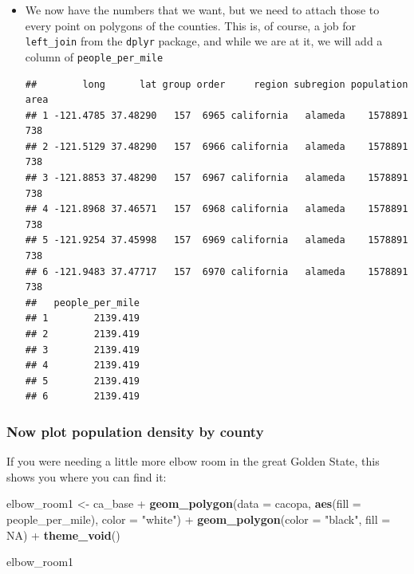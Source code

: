 \documentclass[]{book}
\newenvironment{Shaded}{\begin{snugshade}}{\end{snugshade}}
\newcommand{\KeywordTok}[1]{\textcolor[rgb]{0.13,0.29,0.53}{\textbf{{#1}}}}
\newcommand{\DataTypeTok}[1]{\textcolor[rgb]{0.13,0.29,0.53}{{#1}}}
\newcommand{\StringTok}[1]{\textcolor[rgb]{0.31,0.60,0.02}{{#1}}}
\newcommand{\OtherTok}[1]{\textcolor[rgb]{0.56,0.35,0.01}{{#1}}}
\newcommand{\NormalTok}[1]{{#1}}
\theoremstyle{definition}
\theoremstyle{definition}
\theoremstyle{remark}
\begin{document}
\begin{itemize}
\item
  We now have the numbers that we want, but we need to attach those to
  every point on polygons of the counties. This is, of course, a job for
  \texttt{left\_join} from the \texttt{dplyr} package, and while we are
  at it, we will add a column of \texttt{people\_per\_mile}

\begin{Shaded}
\end{Shaded}

\begin{verbatim}
##        long      lat group order     region subregion population area
## 1 -121.4785 37.48290   157  6965 california   alameda    1578891  738
## 2 -121.5129 37.48290   157  6966 california   alameda    1578891  738
## 3 -121.8853 37.48290   157  6967 california   alameda    1578891  738
## 4 -121.8968 37.46571   157  6968 california   alameda    1578891  738
## 5 -121.9254 37.45998   157  6969 california   alameda    1578891  738
## 6 -121.9483 37.47717   157  6970 california   alameda    1578891  738
##   people_per_mile
## 1        2139.419
## 2        2139.419
## 3        2139.419
## 4        2139.419
## 5        2139.419
## 6        2139.419
\end{verbatim}
\end{itemize}

\subsubsection{Now plot population density by
county}\label{now-plot-population-density-by-county}

If you were needing a little more elbow room in the great Golden State,
this shows you where you can find it:

\begin{Shaded}
\begin{Highlighting}[]
\NormalTok{elbow_room1 <-}\StringTok{ }\NormalTok{ca_base +}\StringTok{ }
\StringTok{      }\KeywordTok{geom_polygon}\NormalTok{(}\DataTypeTok{data =} \NormalTok{cacopa, }\KeywordTok{aes}\NormalTok{(}\DataTypeTok{fill =} \NormalTok{people_per_mile), }\DataTypeTok{color =} \StringTok{"white"}\NormalTok{) +}
\StringTok{      }\KeywordTok{geom_polygon}\NormalTok{(}\DataTypeTok{color =} \StringTok{"black"}\NormalTok{, }\DataTypeTok{fill =} \OtherTok{NA}\NormalTok{) +}
\StringTok{      }\KeywordTok{theme_void}\NormalTok{()}

\NormalTok{elbow_room1 }
\end{Highlighting}
\end{Shaded}
\end{document}
